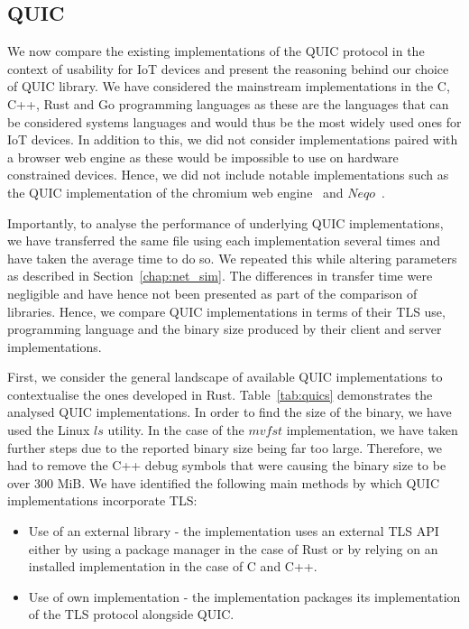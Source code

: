\subsection{QUIC} \label{section:quic_impl}

We now compare the existing implementations of the QUIC protocol in the context of usability for IoT devices and present the reasoning behind our choice of QUIC library.
We have considered the mainstream implementations in the C, C++, Rust and Go programming languages as these are the languages that can be considered systems languages and would thus be the most widely used ones for IoT devices.
In addition to this, we did not consider implementations paired with a browser web engine as these would be impossible to use on hardware constrained devices.
Hence, we did not include notable implementations such as the QUIC implementation of the chromium web engine~\citep{chromium_quic_2021} and $Neqo$~\citep{mozilla_neqo_2022}.

Importantly, to analyse the performance of underlying QUIC implementations, we have transferred the same file using each implementation several times and have taken the average time to do so.
We repeated this while altering parameters as described in Section~\ref{chap:net_sim}.
The differences in transfer time were negligible and have hence not been presented as part of the comparison of libraries.
Hence, we compare QUIC implementations in terms of their TLS use, programming language and the binary size produced by their client and server implementations.

First, we consider the general landscape of available QUIC implementations to contextualise the ones developed in Rust.
Table~\ref{tab:quics} demonstrates the analysed QUIC implementations.
In order to find the size of the binary, we have used the Linux $ls$ utility.
In the case of the $mvfst$ implementation, we have taken further steps due to the reported binary size being far too large.
Therefore, we had to remove the C++ debug symbols that were causing the binary size to be over 300 MiB.
We have identified the following main methods by which QUIC implementations incorporate TLS:

\begin{itemize}
    \item Use of an external library - the implementation uses an external TLS API either by using a package manager in the case of Rust or by relying on an installed implementation in the case of C and C++.
    \item Use of own implementation - the implementation packages its implementation of the TLS protocol alongside QUIC.
\end{itemize}


